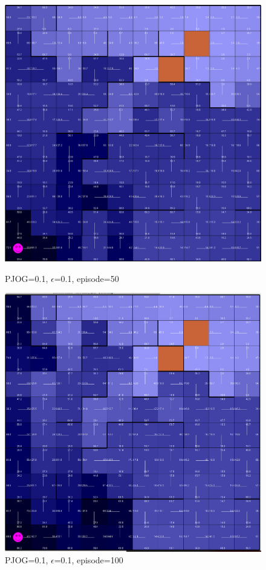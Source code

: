 \documentclass[11pt]{article}
\begin{document}
\begin{figure}[!htb]
   \begin{minipage}{0.4\textwidth}
     \centering
     \includegraphics[width=1.2\linewidth]{../figures/q2_1_50.png}
     \caption{PJOG=0.1, $\epsilon$=0.1, episode=50}\label{Fig:q2_1_50}
   \end{minipage}\hfill
   \begin{minipage}{0.4\textwidth}
     \centering
     \includegraphics[width=1.2\linewidth]{../figures/q2_1_100.png}
     \caption{PJOG=0.1, $\epsilon$=0.1, episode=100}\label{Fig:q2_1_100}
   \end{minipage}
\end{figure}
\end{document}
